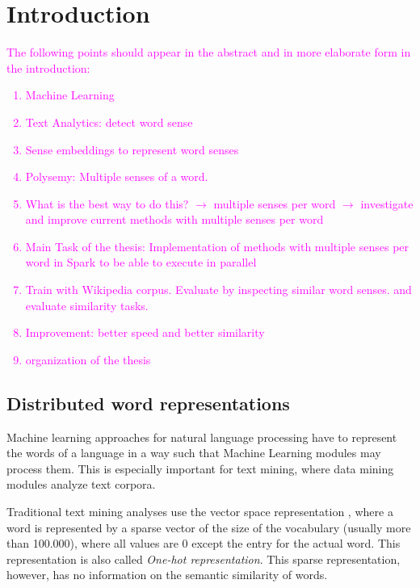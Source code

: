 \chapter{Introduction}
\label{cha:intro}


\textcolor{magenta}{
The following points should appear in the abstract and in more elaborate form in the introduction:
	\begin{enumerate}
		\item Machine Learning
		\item Text Analytics: detect word sense 
		\item Sense embeddings to represent word senses
		\item Polysemy: Multiple senses of a word. 
		\item What is the best way to do this? $\to$ multiple senses per word
		      $\to$ investigate and improve current methods with multiple senses per word
		\item Main Task of the thesis: Implementation of methods with multiple senses per word in Spark to be able to execute in parallel
		\item Train with Wikipedia corpus. Evaluate by inspecting similar word senses.  and evaluate similarity tasks.
		\item Improvement: better speed and better similarity
		\item organization of the thesis	
	\end{enumerate}	
}

\section{Distributed word representations}

\cite{git2010systematic}
Machine learning approaches for natural language processing have to represent the words of a language in a way such that Machine Learning modules may process them. This is especially important for text mining, where data mining modules analyze text corpora. 

Traditional text mining analyses use the vector space representation \citep{SaltonWongEtAl1975}, where a word is represented by a sparse vector of the size of the vocabulary (usually more than 100.000), where all values are 0 except the entry for the actual word. This representation is also called \emph{One-hot representation}. This sparse representation, however, has no information on the semantic similarity of words.


